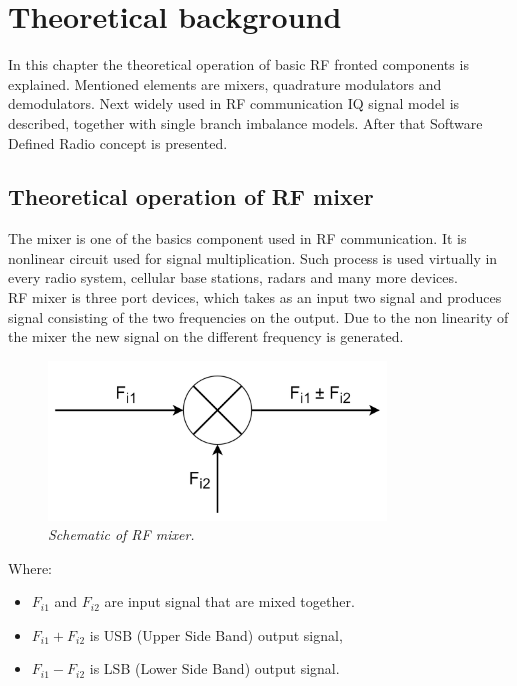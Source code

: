 \documentclass[en,printmode]{mgr}
\begin{document}
\chapter{Theoretical background}
	In this chapter the theoretical operation of basic RF fronted components is explained. Mentioned elements
	are mixers, quadrature modulators and demodulators. Next widely used in RF communication IQ signal model
	is described, together with single branch imbalance models. After that Software Defined Radio concept is
	presented.

	\section{Theoretical operation of RF mixer}
		The mixer is one of the basics component used in RF communication. It is nonlinear circuit used for
		signal multiplication. Such process is used virtually in every radio system, cellular base stations,
		radars and many more devices. 
		\\
		
		RF mixer is three port devices, which takes as an input two signal and produces signal consisting of 
		the two frequencies on the output. Due to the non linearity of the mixer the new signal on the different
		frequency is generated.
		
		\begin{figure}[!htb]
    		\centering
   			\includegraphics[width=0.8\textwidth]{diag/mixer.png}
    		\caption{\textit{Schematic of RF mixer.}}
		\end{figure}
		
		Where:
		\begin{itemize}
			\item $F_{i1}$ and $F_{i2}$ are input signal that are mixed together.
			\item $F_{i1} + F_{i2}$ is USB (Upper Side Band) output signal,
			\item $F_{i1} - F_{i2}$ is LSB (Lower Side Band) output signal.
		\end{itemize}
		
\end{document}
